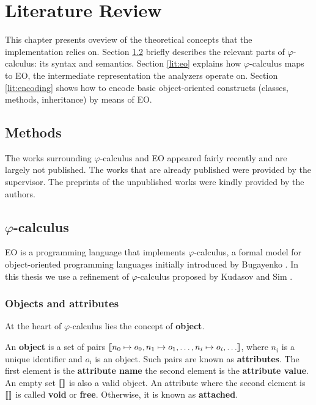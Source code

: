 \chapter{Literature Review}
\label{chap:lr}
This chapter presents oveview of the theoretical concepts that the implementation relies on. Section \ref{lit:phicalc} briefly describes the relevant parts of $\varphi$-calculus: its syntax and semantics. Section \ref{lit:eo} explains how $\varphi$-calculus maps to EO, the intermediate representation the analyzers operate on. Section \ref{lit:encoding} shows how to encode basic object-oriented constructs (classes, methods, inheritance) by means of EO. 

\section{Methods}
The works surrounding $\varphi$-calculus and EO appeared fairly recently and are largely not published. The works that are already published were provided by the supervisor. The preprints of the unpublished works were kindly provided by the authors. 

\section{$\varphi$-calculus}
\label{lit:phicalc}

EO is a programming language that implements $\varphi$-calculus, a formal model for object-oriented programming languages initially introduced by Bugayenko \cite{eolang}. In this thesis we use a refinement of $\varphi$-calculus proposed by Kudasov and Sim \cite{kudasov}.

\subsection{Objects and attributes}
At the heart of $\varphi$-calculus lies the concept of \textbf{object}.

\begin{definition}
    An \textbf{object} is a set of pairs $\llbracket n_0 \mapsto o_0, n_1 \mapsto o_1, \hdots, n_i \mapsto o_i, \hdots \rrbracket$, where $n_i$ is a unique identifier and $o_i$ is an object. Such pairs are known as \textbf{attributes}. The first element is the \textbf{attribute name} the second element is the \textbf{attribute value}. An empty set $\llbracket  \rrbracket$ is also a valid object. An attribute where the second element is $\llbracket  \rrbracket$ is called \textbf{void} or \textbf{free}. Otherwise, it is known as \textbf{attached}.
\end{definition}

